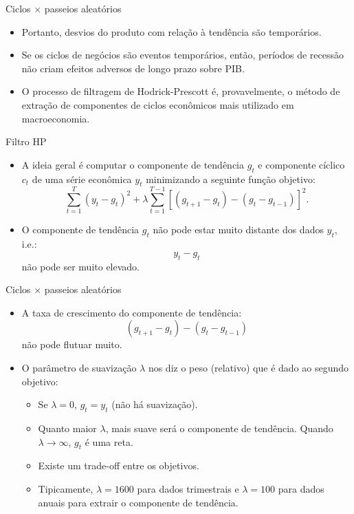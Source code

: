 \documentclass[10pt]{beamer}
\begin{document}
\begin{frame}{Ciclos $\times$ passeios aleatórios}
    \begin{itemize}
        \item Portanto, desvios do produto com relação à tendência são temporários.
        \bigskip
        \item Se os ciclos de negócios são eventos temporários, então, períodos de recessão não criam efeitos adversos de longo prazo sobre PIB.
        \bigskip
        \item O processo de filtragem de Hodrick-Prescott é, provavelmente, o método de extração de componentes de ciclos econômicos mais utilizado em macroeconomia.
    \end{itemize}
\end{frame}

\begin{frame}{Filtro HP}
    \begin{itemize}
        \item A ideia geral é computar o componente de tendência $g_t$ e componente cíclico $c_t$ de uma série econômica $y_t$ minimizando a seguinte função objetivo:
        \[
        \sum_{t=1}^T (y_t - g_t)^2 + \lambda \sum_{t=1}^{T-1} [(g_{t+1} - g_t) - (g_t-g_{t-1})]^2.
        \]
        \bigskip
        \item O componente de tendência $g_t$ não pode estar muito distante dos dados $y_t$, i.e.:
        \[
        y_t - g_t
        \]
        não pode ser muito elevado.
    \end{itemize}
\end{frame}

\begin{frame}{Ciclos $\times$ passeios aleatórios}
    \begin{itemize}
        \item A taxa de crescimento do componente de tendência:
        \[
        (g_{t+1} - g_t) - (g_t - g_{t-1})
        \]
        não pode flutuar muito.
        \bigskip
        \item O parâmetro de suavização $\lambda$ nos diz o peso (relativo) que é dado ao segundo objetivo:
        \bigskip
        \begin{itemize}
            \item Se $\lambda = 0$, $g_t = y_t$ (não há suavização).
            \bigskip
            \item Quanto maior $\lambda$, mais suave será o componente de tendência. Quando $\lambda \to \infty$, $g_t$ é uma reta.
            \bigskip
            \item Existe um trade-off entre os objetivos.
            \bigskip
            \item Tipicamente, $\lambda = 1600$ para dados trimestrais e $\lambda = 100$ para dados anuais para extrair o componente de tendência.
        \end{itemize}
    \end{itemize}
\end{frame}
\end{document}
